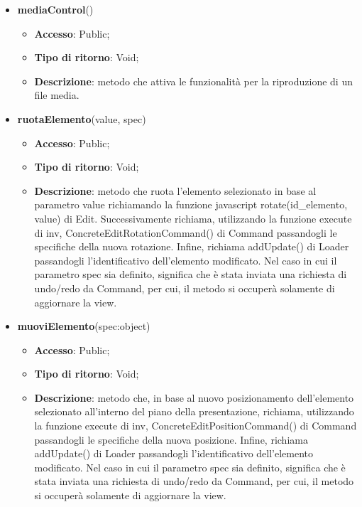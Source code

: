 {{\begin{itemize}
\begin{itemize}
				\item \textbf{Descrizione}: metodo che cambia il contenuto dell'elemento testo textId, in base al parametro textContent, e che successivamente, utilizzando la funzione execute di inv, richiama ConcreteEditContentCommand() di Command passandogli le specifiche del testo modificato. Infine, richiama addUpdate() di Loader passandogli l'identificativo dell'elemento testo modificato. Nel caso in cui il parametro spec sia definito, significa che è stata inviata una richiesta di undo/redo da Command, per cui, il metodo si occuperà solamente di aggiornare la view.
			\end{itemize}
			\item \textbf{mediaControl}()
			\begin{itemize}
				\item \textbf{Accesso}: Public;
				\item \textbf{Tipo di ritorno}: Void;
				\item \textbf{Descrizione}: metodo che attiva le funzionalità per la riproduzione di un file media.
			\end{itemize}
			\item \textbf{ruotaElemento}(value, spec)
			\begin{itemize}
				\item \textbf{Accesso}: Public;
				\item \textbf{Tipo di ritorno}: Void;
				\item \textbf{Descrizione}: metodo che ruota l'elemento selezionato in base al parametro value richiamando la funzione javascript rotate(id\_elemento, value) di Edit. Successivamente richiama, utilizzando la funzione execute di inv, ConcreteEditRotationCommand() di Command passandogli le specifiche della nuova rotazione. Infine, richiama addUpdate() di Loader passandogli l'identificativo dell'elemento modificato. Nel caso in cui il parametro spec sia definito, significa che è stata inviata una richiesta di undo/redo da Command, per cui, il metodo si occuperà solamente di aggiornare la view.
			\end{itemize}
			\item \textbf{muoviElemento}(spec:object)
			\begin{itemize}
				\item \textbf{Accesso}: Public;
				\item \textbf{Tipo di ritorno}: Void;
				\item \textbf{Descrizione}: metodo che, in base al nuovo posizionamento dell'elemento selezionato all'interno del piano della presentazione, richiama, utilizzando la funzione execute di inv, ConcreteEditPositionCommand() di Command passandogli le specifiche della nuova posizione. Infine, richiama addUpdate() di Loader passandogli l'identificativo dell'elemento modificato. Nel caso in cui il parametro spec sia definito, significa che è stata inviata una richiesta di undo/redo da Command, per cui, il metodo si occuperà solamente di aggiornare la view.

\end{itemize}
\end{itemize}}}
